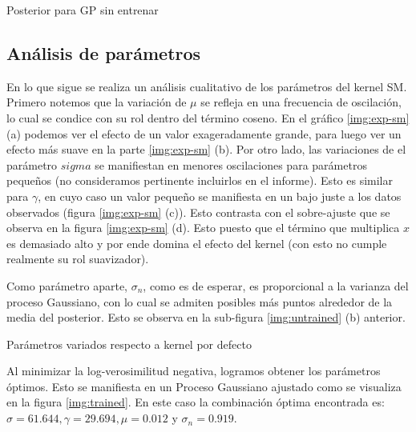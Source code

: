 \documentclass[letterpaper,11pt,oneside]{article}
\theoremstyle{break}
\begin{document}
\begin{images}[\label{img:untrained}]{Posterior para GP sin entrenar}
\end{images}

\subsection{Análisis de parámetros}
En lo que sigue se realiza un análisis cualitativo de los parámetros del kernel SM. Primero notemos que la variación de $\mu$ se refleja en una frecuencia de oscilación, lo cual se condice con su rol dentro del término coseno. En el gráfico \ref{img:exp-sm} (a) podemos ver el efecto de un valor exageradamente grande, para luego ver un efecto más suave en la parte \ref{img:exp-sm} (b). Por otro lado, las variaciones de el parámetro $sigma$ se manifiestan en menores oscilaciones para parámetros pequeños (no consideramos pertinente incluirlos en el informe). Esto es similar para $\gamma$, en cuyo caso un valor pequeño se manifiesta en un bajo juste a los datos observados (figura \ref{img:exp-sm} (c)). Esto contrasta con el sobre-ajuste que se observa en la figura \ref{img:exp-sm} (d). Esto puesto que el término que multiplica $x$ es demasiado alto y por ende domina el efecto del kernel (con esto no cumple realmente su rol suavizador).

\newp Como parámetro aparte, $\sigma_n$, como es de esperar, es proporcional a la varianza del proceso Gaussiano, con lo cual se admiten posibles más puntos alrededor de la media del posterior. Esto se observa en la sub-figura \ref{img:untrained} (b) anterior.

\begin{images}[\label{img:exp-sm}]{Parámetros variados respecto a kernel por defecto}
    \newline
\end{images}

Al minimizar la log-verosimilitud negativa, logramos obtener los parámetros óptimos. Esto se manifiesta en un Proceso Gaussiano ajustado como se visualiza en la figura \ref{img:trained}. En este caso la combinación óptima encontrada es: $\sigma=61.644,\gamma=29.694,\mu=0.012$ y $\sigma_n=0.919$.
\end{document}

